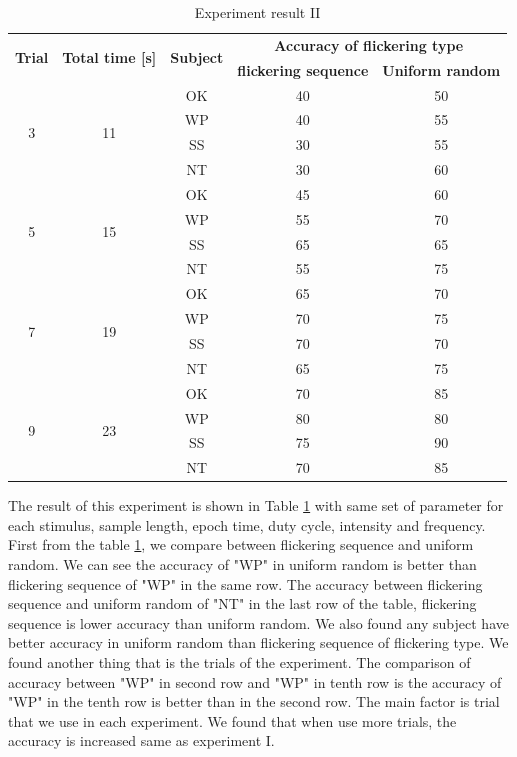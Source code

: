 \begin{table}[ht]
\centering
\begin{tabular}{| c | c | c | c | c |}

			\hline 
			\multirow{2}{*}{\textbf{Trial}} & 
  			\multirow{2}{*}{\textbf{Total time [s]}}  & 
            \multirow{2}{*}{\textbf{Subject}} &
            \multicolumn{2}{c|}{\textbf{Accuracy of flickering type}} \\
            \cline{4-5}
            &&&\multicolumn{1}{c|}{\textbf{flickering sequence}} &\multicolumn{1}{c|}{\textbf{Uniform random}}  \\
			\hline 
			\multirow{4}{*}{3}&\multirow{4}{*}{11}&OK&40&50 \\
			\cline{3-5}
			&&WP&40&55 \\ \cline{3-5}
			&&SS&30&55 \\ \cline{3-5}
			&&NT&30&60 \\
            \hline
			\multirow{4}{*}{5}&\multirow{4}{*}{15}&OK&45&60 \\
			\cline{3-5}
			&&WP&55&70 \\ \cline{3-5}
			&&SS&65&65 \\ \cline{3-5}
			&&NT&55&75 \\
            \hline
            \multirow{4}{*}{7}&\multirow{4}{*}{19}&OK&65&70 \\
			\cline{3-5}
			&&WP&70&75 \\ \cline{3-5}
			&&SS&70&70 \\ \cline{3-5}
			&&NT&65&75 \\
            \hline 
            \multirow{4}{*}{9}&\multirow{4}{*}{23}&OK&70&85 \\
			\cline{3-5}
			&&WP&80&80 \\ \cline{3-5}
			&&SS&75&90 \\ \cline{3-5}
			&&NT&70&85 \\
            \hline 
		\end{tabular}       
\caption{Experiment result II}
\label{table:result2}
\end{table}

The result of this experiment is shown in Table \ref{table:result2} with same set of parameter for each stimulus, sample length, epoch time, duty cycle, intensity and frequency. First from the table \ref{table:result2}, we compare between flickering sequence and uniform random. We can see the accuracy of "WP" in uniform random is better than flickering sequence of "WP" in the same row. The accuracy between flickering sequence and uniform random of "NT" in the last row of the table, flickering sequence is lower accuracy than uniform random. We also found any subject have better accuracy in uniform random than flickering sequence of flickering type. We found another thing that is the trials of the experiment. The comparison of accuracy between "WP" in second row and "WP" in tenth row is the accuracy of "WP" in the tenth row is better than in the second row. The main factor is trial that we use in each experiment. We found that when use more trials, the accuracy is increased same as experiment I.

